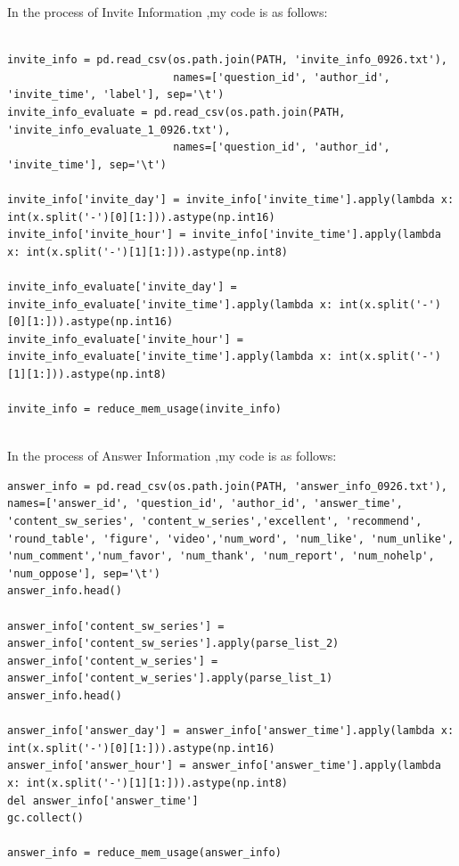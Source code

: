 \documentclass[sigconf]{acmart}
\begin{document}
In the process of Invite Information ,my code is as follows:
\begin{lstlisting}

invite_info = pd.read_csv(os.path.join(PATH, 'invite_info_0926.txt'), 
                          names=['question_id', 'author_id', 'invite_time', 'label'], sep='\t')
invite_info_evaluate = pd.read_csv(os.path.join(PATH, 'invite_info_evaluate_1_0926.txt'), 
                          names=['question_id', 'author_id', 'invite_time'], sep='\t')
                          
invite_info['invite_day'] = invite_info['invite_time'].apply(lambda x: int(x.split('-')[0][1:])).astype(np.int16)
invite_info['invite_hour'] = invite_info['invite_time'].apply(lambda x: int(x.split('-')[1][1:])).astype(np.int8)

invite_info_evaluate['invite_day'] = invite_info_evaluate['invite_time'].apply(lambda x: int(x.split('-')[0][1:])).astype(np.int16)
invite_info_evaluate['invite_hour'] = invite_info_evaluate['invite_time'].apply(lambda x: int(x.split('-')[1][1:])).astype(np.int8)

invite_info = reduce_mem_usage(invite_info)                          
                          

\end{lstlisting}

In the process of Answer Information ,my code is as follows:

\begin{lstlisting}
answer_info = pd.read_csv(os.path.join(PATH, 'answer_info_0926.txt'), 
names=['answer_id', 'question_id', 'author_id', 'answer_time', 'content_sw_series', 'content_w_series','excellent', 'recommend', 'round_table', 'figure', 'video','num_word', 'num_like', 'num_unlike', 'num_comment','num_favor', 'num_thank', 'num_report', 'num_nohelp', 'num_oppose'], sep='\t')
answer_info.head()

answer_info['content_sw_series'] = answer_info['content_sw_series'].apply(parse_list_2) 
answer_info['content_w_series'] = answer_info['content_w_series'].apply(parse_list_1) 
answer_info.head()

answer_info['answer_day'] = answer_info['answer_time'].apply(lambda x: int(x.split('-')[0][1:])).astype(np.int16)
answer_info['answer_hour'] = answer_info['answer_time'].apply(lambda x: int(x.split('-')[1][1:])).astype(np.int8)
del answer_info['answer_time']
gc.collect()

answer_info = reduce_mem_usage(answer_info)
\end{lstlisting}
\end{document}
